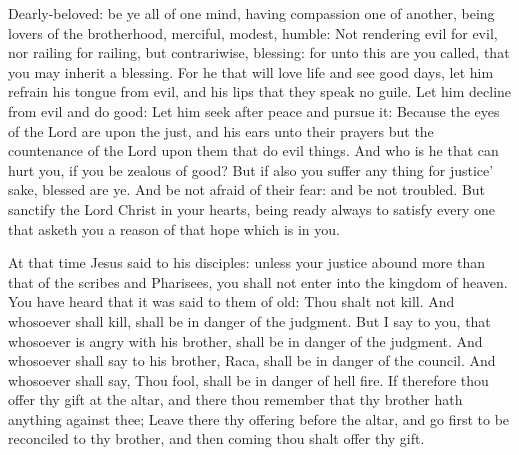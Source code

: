



Dearly-beloved: be ye all of one mind, having compassion one of
another, being lovers of the brotherhood, merciful, modest, humble:
Not rendering evil for evil, nor railing for railing, but
contrariwise, blessing: for unto this are you called, that you may
inherit a blessing.
For he that will love life and see good days, let him refrain his
tongue from evil, and his lips that they speak no guile.
Let him decline from evil and do good: Let him seek after peace
and pursue it:
Because the eyes of the Lord are upon the just, and his ears unto
their prayers but the countenance of the Lord upon them that do evil
things.
And who is he that can hurt you, if you be zealous of good?
But if also you suffer any thing for justice' sake, blessed are
ye. And be not afraid of their fear: and be not troubled.
But sanctify the Lord Christ in your hearts, being ready always to
satisfy every one that asketh you a reason of that hope which is in you.




At that time Jesus said to his disciples:
unless your justice abound more than that of
the scribes and Pharisees, you shall not enter into the kingdom of
heaven.
You have heard that it was said to them of old: Thou shalt not
kill. And whosoever shall kill, shall be in danger of the judgment.
But I say to you, that whosoever is angry with his brother, shall
be in danger of the judgment. And whosoever shall say to his brother,
Raca, shall be in danger of the council. And whosoever shall say, Thou
fool, shall be in danger of hell fire.
If therefore thou offer thy gift at the altar, and there thou
remember that thy brother hath anything against thee;
Leave there thy offering before the altar, and go first to be
reconciled to thy brother, and then coming thou shalt offer thy gift.


